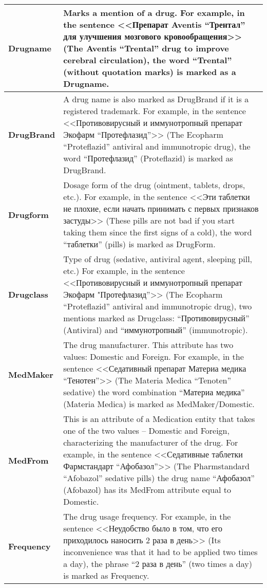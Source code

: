 \begin{tabular}{|p{}|p{}|}
\hline
\textbf{Drugname}       & Marks a mention of a drug. For example, in the sentence <<Препарат Aventis ``Трентал'' для улучшения мозгового кровообращения>> (The Aventis ``Trental'' drug to improve cerebral circulation), the word ``Trental'' (without quotation marks) is marked as a Drugname.
\\ \hline
\textbf{DrugBrand}      & A drug name is also marked as DrugBrand if it is a registered trademark. For example, in the sentence <<Противовирусный и иммунотропный препарат Экофарм ``Протефлазид''>> (The Ecopharm ``Proteflazid'' antiviral and immunotropic drug), the word ``Протефлазид'' (Proteflazid) is marked as DrugBrand.
\\ \hline
\textbf{Drugform}       & Dosage form of the drug (ointment, tablets, drops, etc.). For example, in the sentence <<Эти таблетки не плохие, если начать принимать с первых признаков застуды>> (These pills are not bad if you start taking them since the first signs of a cold), the word ``таблетки'' (pills) is marked as DrugForm.
\\ \hline
\textbf{Drugclass}      & Type of drug (sedative, antiviral agent, sleeping pill, etc.) For example, in the sentence <<Противовирусный и иммунотропный препарат Экофарм "Протефлазид”>> (The Ecopharm ``Proteflazid'' antiviral and immunotropic drug), two mentions marked as Drugclass: ``Противовирусный'' (Antiviral) and ``иммунотропный'' (immunotropic).
\\ \hline
\textbf{MedMaker}       & The drug manufacturer. This attribute has two values: Domestic and Foreign. For example, in the sentence <<Седативный препарат Материа медика ``Тенотен''>> (The Materia Medica ``Tenoten'' sedative) the word combination ``Материа медика'' (Materia Medica) is marked as MedMaker/Domestic.
\\ \hline
\textbf{MedFrom}        & This is an attribute of a Medication entity that takes one of the two values -- Domestic and Foreign, characterizing the manufacturer of the drug. For example, in the sentence <<Седативные таблетки Фармстандарт “Афобазол”>> (The Pharmstandard ``Afobazol'' sedative pills) the drug name ``Афобазол'' (Afobazol) has its MedFrom attribute equal to Domestic.
\\ \hline
\textbf{Frequency}      & The drug usage frequency. For example, in the sentence <<Неудобство было в том, что его приходилось наносить 2 раза в день>> (Its inconvenience was that it had to be applied two times a day), the phrase ``2 раза в день'' (two times a day) is marked as Frequency.

\end{tabular}
